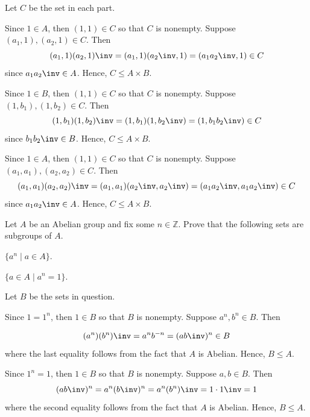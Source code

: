 \begin{sol}
    Let $C$ be the set in each part.
    \begin{subproblems}
        \item Since $1 \in A$, then $(1, 1) \in C$ so that $C$ is nonempty. Suppose $(a_1, 1), (a_2, 1) \in C$. Then
        \[(a_1, 1)(a_2, 1)\inv = (a_1, 1)(a_2\inv, 1) = (a_1a_2\inv, 1) \in C\]
        since $a_1a_2\inv \in A$. Hence, $C \leq A \times B$.
        \item Since $1 \in B$, then $(1, 1) \in C$ so that $C$ is nonempty. Suppose $(1, b_1), (1, b_2) \in C$. Then
        \[(1, b_1)(1, b_2)\inv = (1, b_1)(1, b_2\inv) = (1, b_1b_2\inv) \in C\]
        since $b_1b_2\inv \in B$. Hence, $C \leq A \times B$.
        \item Since $1 \in A$, then $(1, 1) \in C$ so that $C$ is nonempty. Suppose $(a_1, a_1), (a_2, a_2) \in C$. Then
        \[(a_1, a_1)(a_2, a_2)\inv = (a_1, a_1)(a_2\inv, a_2\inv) = (a_1a_2\inv, a_1a_2\inv) \in C\]
        since $a_1a_2\inv \in A$. Hence, $C \leq A \times B$. \qh
    \end{subproblems}
\end{sol}

\begin{exercise} \label{ex2.1.12}
    Let $A$ be an Abelian group and fix some $n \in \mathbb{Z}$. Prove that the following sets are subgroups of $A$.
    \begin{subproblems}
        \item $\{ a^n \mid a \in A \}$.
        \item $\{ a \in A \mid a^n = 1 \}$.
    \end{subproblems}
\end{exercise}

\begin{sol}
    Let $B$ be the sets in question.
    \begin{subproblems}
        \item Since $1 = 1^n$, then $1 \in B$ so that $B$ is nonempty. Suppose $a^n, b^n \in B$. Then
        \item \[(a^n)(b^n)\inv = a^n b^{-n} = (ab\inv)^n \in B\]
        where the last equality follows from the fact that $A$ is Abelian. Hence, $B \leq A$.
        \item Since $1^n = 1$, then $1 \in B$ so that $B$ is nonempty. Suppose $a, b \in B$. Then
        \[(ab\inv)^n = a^n (b\inv)^n = a^n (b^n)\inv = 1 \cdot 1\inv = 1\]
        where the second equality follows from the fact that $A$ is Abelian. Hence, $B \leq A$. \qh
    \end{subproblems}
\end{sol}

